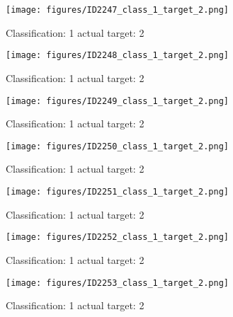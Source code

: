 \begin{figure}[h!]
\begin{center}
\texttt{[image: figures/ID2247\_class\_1\_target\_2.png]}
\end{center}
\caption{ Classification: 1 actual target: 2}
\label{fig:ID2247_class_1_target_2}
\end{figure}
\begin{figure}[h!]
\begin{center}
\texttt{[image: figures/ID2248\_class\_1\_target\_2.png]}
\end{center}
\caption{ Classification: 1 actual target: 2}
\label{fig:ID2248_class_1_target_2}
\end{figure}
\begin{figure}[h!]
\begin{center}
\texttt{[image: figures/ID2249\_class\_1\_target\_2.png]}
\end{center}
\caption{ Classification: 1 actual target: 2}
\label{fig:ID2249_class_1_target_2}
\end{figure}
\begin{figure}[h!]
\begin{center}
\texttt{[image: figures/ID2250\_class\_1\_target\_2.png]}
\end{center}
\caption{ Classification: 1 actual target: 2}
\label{fig:ID2250_class_1_target_2}
\end{figure}
\begin{figure}[h!]
\begin{center}
\texttt{[image: figures/ID2251\_class\_1\_target\_2.png]}
\end{center}
\caption{ Classification: 1 actual target: 2}
\label{fig:ID2251_class_1_target_2}
\end{figure}
\begin{figure}[h!]
\begin{center}
\texttt{[image: figures/ID2252\_class\_1\_target\_2.png]}
\end{center}
\caption{ Classification: 1 actual target: 2}
\label{fig:ID2252_class_1_target_2}
\end{figure}
\begin{figure}[h!]
\begin{center}
\texttt{[image: figures/ID2253\_class\_1\_target\_2.png]}
\end{center}
\caption{ Classification: 1 actual target: 2}
\label{fig:ID2253_class_1_target_2}
\end{figure}
